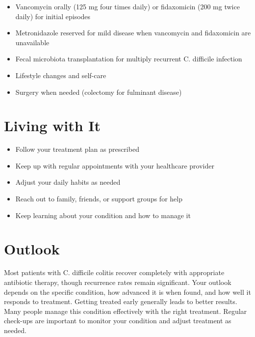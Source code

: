\begin{itemize}[noitemsep]
  \item Vancomycin orally (125 mg four times daily) or fidaxomicin (200 mg twice daily) for initial episodes
  \item Metronidazole reserved for mild disease when vancomycin and fidaxomicin are unavailable
  \item Fecal microbiota transplantation for multiply recurrent C. difficile infection
  \item Lifestyle changes and self-care
  \item Surgery when needed (colectomy for fulminant disease)
\end{itemize}

\section{Living with It}

\begin{itemize}[noitemsep]
  \item Follow your treatment plan as prescribed
  \item Keep up with regular appointments with your healthcare provider
  \item Adjust your daily habits as needed
  \item Reach out to family, friends, or support groups for help
  \item Keep learning about your condition and how to manage it
\end{itemize}

\section{Outlook}
Most patients with C. difficile colitis recover completely with appropriate antibiotic therapy, though recurrence rates remain significant. Your outlook depends on the specific condition, how advanced it is when found, and how well it responds to treatment. Getting treated early generally leads to better results. Many people manage this condition effectively with the right treatment. Regular check-ups are important to monitor your condition and adjust treatment as needed.
